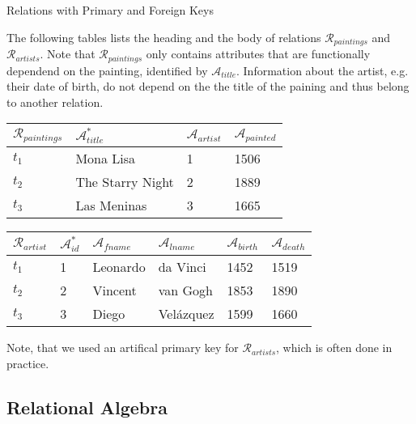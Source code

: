 \begin{example}[label=example:relational_table_pkfk]{Relations with Primary and Foreign Keys}{}
    
    The following tables lists the heading and the body of relations $\mathcal{R}_{paintings}$ and $\mathcal{R}_{artists}$.  Note that $\mathcal{R}_{paintings}$ only contains attributes that are functionally dependend on the painting, identified by $\mathcal{A}_{title}$. Information about the artist, e.g. their date of birth, do not depend on the the title of the paining and thus belong to another relation.
        
    \begin{center}
        \begin{tabular}{ l || l | l | l |}
            $\mathcal{R}_{paintings}$ & $\mathcal{A}^{*}_{title}$  & $\mathcal{A}_{artist}$  & $\mathcal{A}_{painted}$ \\ 
            \hline
            \hline
            $t_1$ & Mona Lisa &  1 & 1506 \\
            \hline
            $t_2$ & The Starry Night & 2 & 1889 \\
            \hline
            $t_3$ & Las Meninas & 3 & 1665 \\
            \hline
        \end{tabular}
    \end{center}

    \begin{center}
        \begin{tabular}{ l || l | l | l | l | l |}
            $\mathcal{R}_{artist}$ & $\mathcal{A}^{*}_{id}$ & $\mathcal{A}_{fname}$ & $\mathcal{A}_{lname}$ & $\mathcal{A}_{birth}$ & $\mathcal{A}_{death}$\\ 
            \hline
            \hline
            $t_1$ & 1 & Leonardo & da Vinci & 1452 & 1519 \\
            \hline
            $t_2$ & 2 & Vincent & van Gogh & 1853 & 1890 \\
            \hline
            $t_3$ & 3 & Diego & Velázquez & 1599 & 1660 \\
            \hline
        \end{tabular}
    \end{center}

    Note, that we used an artifical primary key for $\mathcal{R}_{artists}$, which is often done in practice.
\end{example}


\subsection{Relational Algebra}

